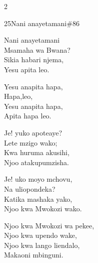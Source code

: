 \documentclass{article}
\begin{document}
\begin{multicols}{2}
\begin{hymn}{25}{Nani anayetamani}{\#86}
\begin{stanza}
Nani anayetamani\\
Msamaha wa Bwana?\\
Sikia habari njema,\\
Yesu apita leo.
\end{stanza}
\begin{chorus}
Yesu anapita hapa,\\
Hapa,leo,\\
Yesu anapita hapa,\\
Apita hapa leo.
\end{chorus}
\begin{stanza}
Je! yuko apoteaye?\\
Lete mzigo wako;\\
Kwa huruma akusihi,\\
Njoo atakupumzisha.
\end{stanza}
\begin{stanza}
Je! uko moyo mchovu,\\
Na uliopondeka?\\
Katika mashaka yako,\\
Njoo kwa Mwokozi wako.
\end{stanza}
\begin{stanza}
Njoo kwa Mwokozi wa pekee,\\
Njoo kwa upendo wake,\\
Njoo kwa lango liendalo,\\
Makaoni mbinguni.
\end{stanza}
\end{hymn}


\end{multicols}
\end{document}
